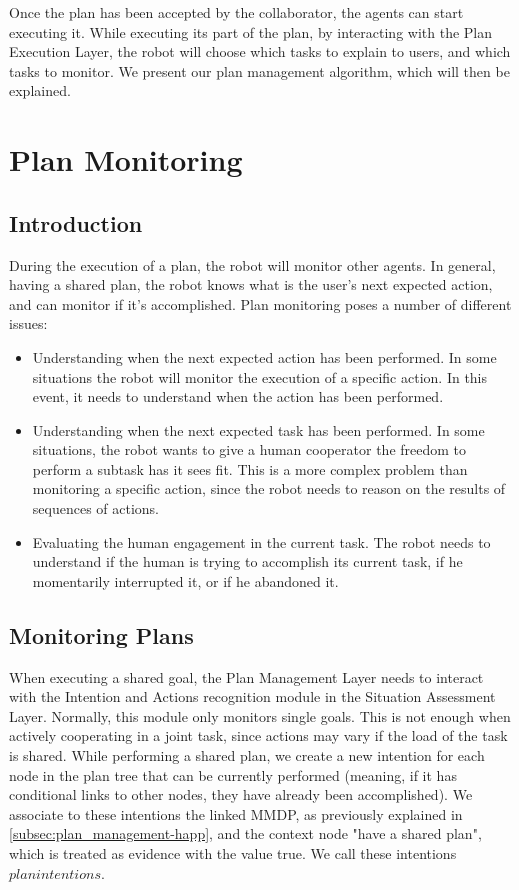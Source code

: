 Once the plan has been accepted by the collaborator, the agents can start executing it. While executing its part of the plan, by interacting with the Plan Execution Layer, the robot will choose which tasks to explain to users, and which tasks to monitor. We present our plan management algorithm, which will then be explained.


\section{Plan Monitoring}
\subsection{Introduction}
During the execution of a plan, the robot will monitor other agents. In general, having a shared plan, the robot knows what is the user's next expected action, and can monitor if it's accomplished. Plan monitoring poses a number of different issues:
\begin{itemize}
\item Understanding when the next expected action has been performed. In some situations the robot will monitor the execution of a specific action. In this event, it needs to understand when the action has been performed.
\item Understanding when the next expected task has been performed. In some situations, the robot wants to give a human cooperator the freedom to perform a subtask has it sees fit. This is a more complex problem than monitoring a specific action, since the robot needs to reason on the results of sequences of actions.
\item Evaluating the human engagement in the current task. The robot needs to understand if the human is trying to accomplish its current task, if he momentarily interrupted it, or if he abandoned it.
\end{itemize}

\subsection{Monitoring Plans}
When executing a shared goal, the Plan Management Layer needs to interact with the Intention and Actions recognition module in the Situation Assessment Layer. Normally, this module only monitors single goals. This is not enough when actively cooperating in a joint task, since actions may vary if the load of the task is shared. While performing a shared plan, we create a new intention for each node in the plan tree that can be currently performed (meaning, if it has conditional links to other nodes, they have already been accomplished). We associate to these intentions the linked MMDP, as previously explained in \ref{subsec:plan_management-happ}, and the context node "have a shared plan", which is treated as evidence with the value true. We call these intentions $plan intentions$.


